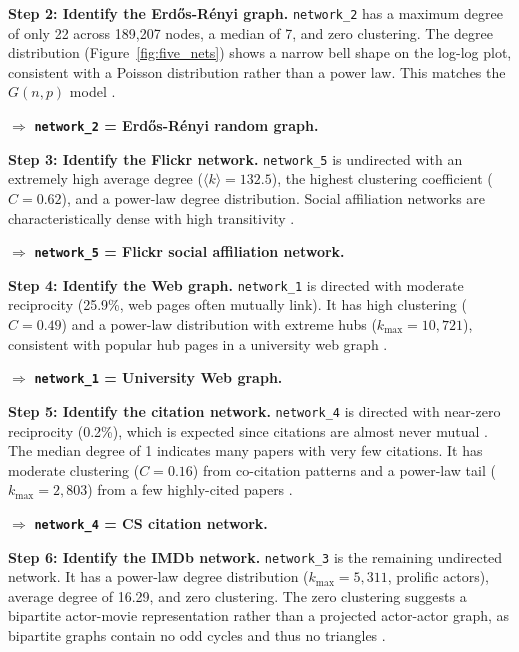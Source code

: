 \documentclass[12pt]{article}
\theoremstyle{definition}
\begin{document}
\noindent
\textbf{Step 2: Identify the Erd\H{o}s-R\'enyi graph.} \texttt{network\_2} has a maximum degree of only 22 across 189,207 nodes, a median of 7, and zero clustering. The degree distribution (Figure~\ref{fig:five_nets}) shows a narrow bell shape on the log-log plot, consistent with a Poisson distribution rather than a power law. This matches the $G(n,p)$ model \cite{erdos1959random}.

\vspace{0.5em}
\noindent
$\Rightarrow$ \textbf{\texttt{network\_2} = Erd\H{o}s-R\'enyi random graph.}

\noindent
\textbf{Step 3: Identify the Flickr network.} \texttt{network\_5} is undirected with an extremely high average degree ($\langle k \rangle = 132.5$), the highest clustering coefficient ($C = 0.62$), and a power-law degree distribution. Social affiliation networks are characteristically dense with high transitivity \cite{barabasi1999emergence, newman2010networks}.

\vspace{0.5em}
\noindent
$\Rightarrow$ \textbf{\texttt{network\_5} = Flickr social affiliation network.}

\noindent
\textbf{Step 4: Identify the Web graph.} \texttt{network\_1} is directed with moderate reciprocity (25.9\%, web pages often mutually link). It has high clustering ($C = 0.49$) and a power-law distribution with extreme hubs ($k_{\max} = 10{,}721$), consistent with popular hub pages in a university web graph \cite{barabasi2016network}.

\vspace{0.5em}
\noindent
$\Rightarrow$ \textbf{\texttt{network\_1} = University Web graph.}

\noindent
\textbf{Step 5: Identify the citation network.} \texttt{network\_4} is directed with near-zero reciprocity (0.2\%), which is expected since citations are almost never mutual \cite{newman2010networks}. The median degree of 1 indicates many papers with very few citations. It has moderate clustering ($C = 0.16$) from co-citation patterns and a power-law tail ($k_{\max} = 2{,}803$) from a few highly-cited papers \cite{barabasi2016network}.

\vspace{0.5em}
\noindent
$\Rightarrow$ \textbf{\texttt{network\_4} = CS citation network.}

\noindent
\textbf{Step 6: Identify the IMDb network.} \texttt{network\_3} is the remaining undirected network. It has a power-law degree distribution ($k_{\max} = 5{,}311$, prolific actors), average degree of 16.29, and zero clustering. The zero clustering suggests a bipartite actor-movie representation rather than a projected actor-actor graph, as bipartite graphs contain no odd cycles and thus no triangles \cite{newman2010networks}.
\end{document}
